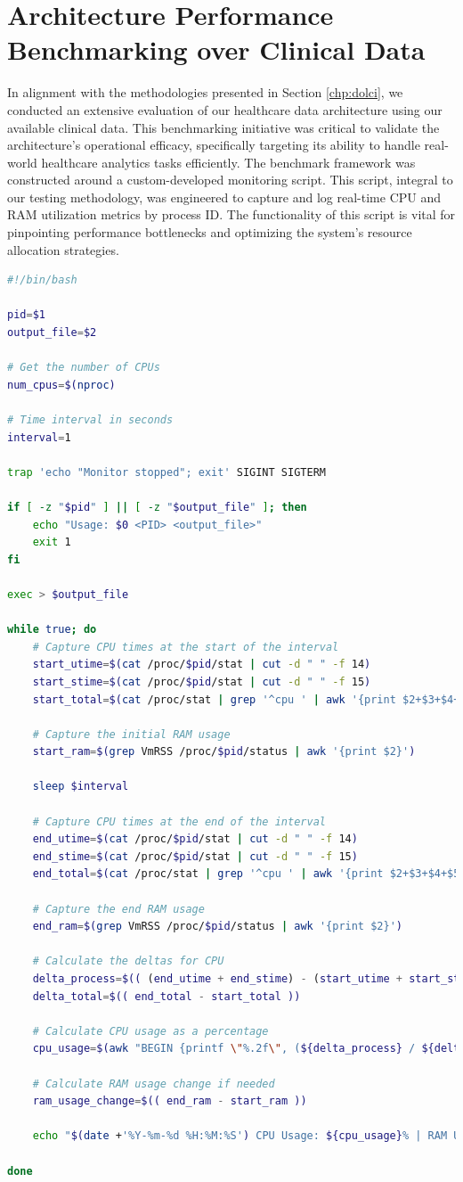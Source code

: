 \section{Architecture Performance Benchmarking over Clinical Data}
In alignment with the methodologies presented in Section \ref{chp:dolci}, we conducted an extensive evaluation of our healthcare data architecture using our available clinical data. This benchmarking initiative was critical to validate the architecture's operational efficacy, specifically targeting its ability to handle real-world healthcare analytics tasks efficiently.
The benchmark framework was constructed around a custom-developed monitoring script. This script, integral to our testing methodology, was engineered to capture and log real-time CPU and RAM utilization metrics by process ID. The functionality of this script is vital for pinpointing performance bottlenecks and optimizing the system's resource allocation strategies.
\begin{lstlisting}[language=bash, caption={Custom Monitor Script for Performance Tracking}, label={lst}] 
#!/bin/bash

pid=$1
output_file=$2

# Get the number of CPUs
num_cpus=$(nproc)

# Time interval in seconds
interval=1

trap 'echo "Monitor stopped"; exit' SIGINT SIGTERM

if [ -z "$pid" ] || [ -z "$output_file" ]; then
    echo "Usage: $0 <PID> <output_file>"
    exit 1
fi

exec > $output_file

while true; do
    # Capture CPU times at the start of the interval
    start_utime=$(cat /proc/$pid/stat | cut -d " " -f 14)
    start_stime=$(cat /proc/$pid/stat | cut -d " " -f 15)
    start_total=$(cat /proc/stat | grep '^cpu ' | awk '{print $2+$3+$4+$5+$6+$7+$8}')

    # Capture the initial RAM usage
    start_ram=$(grep VmRSS /proc/$pid/status | awk '{print $2}')

    sleep $interval

    # Capture CPU times at the end of the interval
    end_utime=$(cat /proc/$pid/stat | cut -d " " -f 14)
    end_stime=$(cat /proc/$pid/stat | cut -d " " -f 15)
    end_total=$(cat /proc/stat | grep '^cpu ' | awk '{print $2+$3+$4+$5+$6+$7+$8}')

    # Capture the end RAM usage
    end_ram=$(grep VmRSS /proc/$pid/status | awk '{print $2}')

    # Calculate the deltas for CPU
    delta_process=$(( (end_utime + end_stime) - (start_utime + start_stime) ))
    delta_total=$(( end_total - start_total ))

    # Calculate CPU usage as a percentage
    cpu_usage=$(awk "BEGIN {printf \"%.2f\", (${delta_process} / ${delta_total}) * 100 * ${num_cpus}}")

    # Calculate RAM usage change if needed
    ram_usage_change=$(( end_ram - start_ram ))

    echo "$(date +'%Y-%m-%d %H:%M:%S') CPU Usage: ${cpu_usage}% | RAM Usage Change: ${ram_usage_change} kB"

done
\end{lstlisting}
